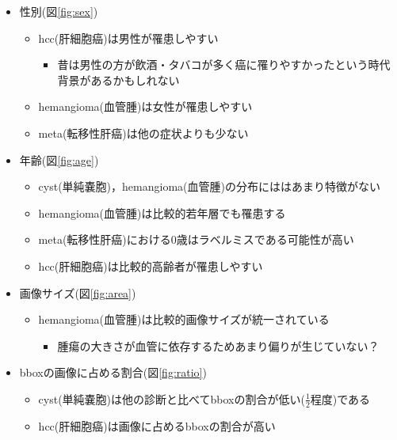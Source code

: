 \documentclass[a4j]{ujarticle}
\newcommand{\Fref}[1]{\mbox{図\ref{fig:#1}}}
\begin{document}
\begin{itemize}
\begin{itemize}
\begin{figure}[h]
                \end{figure}
                \item 性別(\Fref{sex})
                \begin{itemize}
                    \item hcc(肝細胞癌)は男性が罹患しやすい
                    \begin{itemize}
                        \item 昔は男性の方が飲酒・タバコが多く癌に罹りやすかったという時代背景があるかもしれない
                    \end{itemize}
                    \item hemangioma(血管腫)は女性が罹患しやすい
                    \item meta(転移性肝癌)は他の症状よりも少ない
                \end{itemize}
                \item 年齢(\Fref{age})
                \begin{itemize}
                    \item cyst(単純嚢胞)，hemangioma(血管腫)の分布にははあまり特徴がない
                    \item hemangioma(血管腫)は比較的若年層でも罹患する
                    \item meta(転移性肝癌)における0歳はラベルミスである可能性が高い
                    \item hcc(肝細胞癌)は比較的高齢者が罹患しやすい
                \end{itemize}
                \item 画像サイズ(\Fref{area})
                \begin{itemize}
                    \item hemangioma(血管腫)は比較的画像サイズが統一されている
                    \begin{itemize}
                        \item 腫瘍の大きさが血管に依存するためあまり偏りが生じていない？
                    \end{itemize}
                \end{itemize}
                \item bboxの画像に占める割合(\Fref{ratio})
                \begin{itemize}
                    \item cyst(単純嚢胞)は他の診断と比べてbboxの割合が低い($\frac{1}{2}$程度)である
                    \item hcc(肝細胞癌)は画像に占めるbboxの割合が高い
                \end{itemize}
            \end{itemize}
        \end{itemize}
\end{document}
